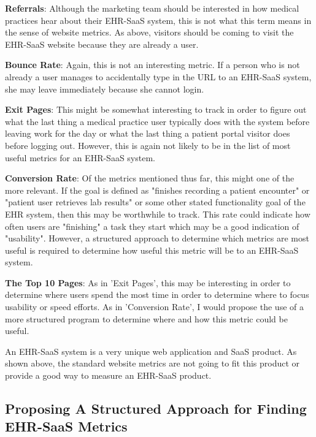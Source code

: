 \documentclass[10pt]{article}
\begin{document}
\textbf{Referrals}: Although the marketing team should be interested in how medical practices hear about their EHR-SaaS system, this is not what this term means in the sense of website metrics.
As above, visitors should be coming to visit the EHR-SaaS website because they are already a user.

\textbf{Bounce Rate}: Again, this is not an interesting metric. If a person who is not already a user manages to accidentally type in the URL to an EHR-SaaS system, she may leave immediately because she cannot login.

\textbf{Exit Pages}: This might be somewhat interesting to track in order to figure out what the last thing a medical practice user typically does with the system before leaving work for the day or what the last thing a patient portal visitor does before logging out.
However, this is again not likely to be in the list of most useful metrics for an EHR-SaaS system.

\textbf{Conversion Rate}: Of the metrics mentioned thus far, this might one of the more relevant.
If the goal is defined as "finishes recording a patient encounter" or "patient user retrieves lab results" or some other stated functionality goal of the EHR system, then this may be worthwhile to track.
This rate could indicate how often users are "finishing" a task they start which may be a good indication of "usability".
However, a structured approach to determine which metrics are most useful is required to determine how useful this metric will be to an EHR-SaaS system.

\textbf{The Top 10 Pages}: As in 'Exit Pages', this may be interesting in order to determine where users spend the most time in order to determine where to focus usability or speed efforts.
As in 'Conversion Rate', I would propose the use of a more structured program to determine where and how this metric could be useful.

An EHR-SaaS system is a very unique web application and SaaS product.
As shown above, the standard website metrics are not going to fit this product or provide a good way to measure an EHR-SaaS product.

\subsection{Proposing A Structured Approach for Finding EHR-SaaS Metrics}
\label{sec:EHR-SaaS-GQM-Intro}
\end{document}
